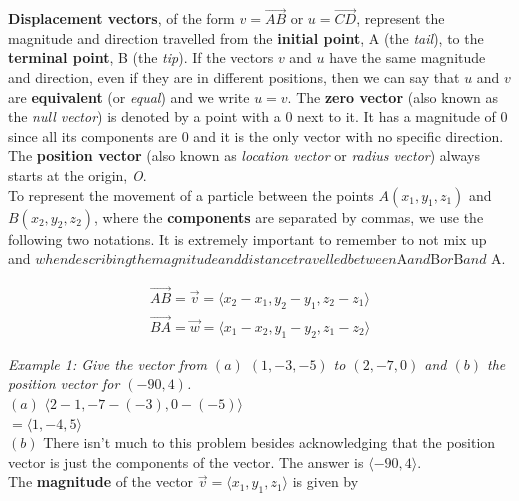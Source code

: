         \noindent\textbf{Displacement vectors}, of the form $v=\overrightarrow{AB}$ or
        $u=\overrightarrow{CD}$, represent the magnitude and direction travelled from the
        \textbf{initial point}, A (the \emph{tail}), to the \textbf{terminal point}, B
        (the \emph{tip}). If the vectors $v$ and $u$ have the same magnitude and direction,
        even if they are in different positions, then we can say that $u$ and $v$ are
        \textbf{equivalent} (or \emph{equal}) and we write \textbf{$u=v$}. The
        \textbf{zero vector} (also known as the \emph{null vector}) is denoted by a point with a
        0 next to it. It has a magnitude of 0 since all its components are 0 and it is the only
        vector with no specific direction. The \textbf{position vector}
        (also known as \emph{location vector} or \emph{radius vector}) always starts at the
        origin, \emph{O}.\\

        \noindent To represent the movement of a particle between the points $A(x_1,y_1,z_1)$
        and $B(x_2,y_2,z_2)$, where the \textbf{components} are separated by commas, we use the
        following two notations. It is extremely important to remember to not mix up
         and 
        $when describing the magnitude and distance travelled between $A$ and $B$ or $B$ and $ A.

        \begin{align*}
            \overrightarrow{AB} = \overrightarrow{v} = \langle x_2-x_1, y_2-y_1, z_2-z_1\rangle\\
            \overrightarrow{BA} = \overrightarrow{w} = \langle x_1-x_2, y_1-y_2, z_1-z_2\rangle
        \end{align*}

        \noindent \color{blue} \textit{Example 1: Give the vector from $(a)$ $(1,-3,-5)$ to
        $(2,-7,0)$ and $(b)$ the position vector for $(-90,4)$.} \color{black} \\
        $(a)$ $\langle2-1,-7-(-3),0-(-5)\rangle$\\
        $=\langle1,-4,5\rangle$\\
        $(b)$ There isn't much to this problem besides acknowledging that the position vector
        is just the components of the vector. The answer is $\langle-90,4\rangle$. \\

        \noindent The \textbf{magnitude} of the vector
        $\overrightarrow{v}=\langle x_1,y_1,z_1\rangle$ is given by

